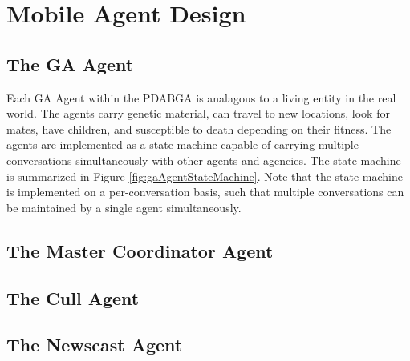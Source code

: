   \section{Mobile Agent Design}
    \subsection{The GA Agent}
    Each GA Agent within the PDABGA is analagous to a living entity in the real world.
    The agents carry genetic material, can travel to new locations, look for
      mates, have children, and susceptible to death depending on their fitness.
    The agents are implemented as a state machine capable of carrying multiple
      conversations simultaneously with other agents and agencies. 
    The state machine is summarized in Figure \ref{fig:gaAgentStateMachine}.
    Note that the state machine is implemented on a per-conversation basis, such that
      multiple conversations can be maintained by a single agent simultaneously. 

    \subsection{The Master Coordinator Agent}

    \subsection{The Cull Agent}

    \subsection{The Newscast Agent}


